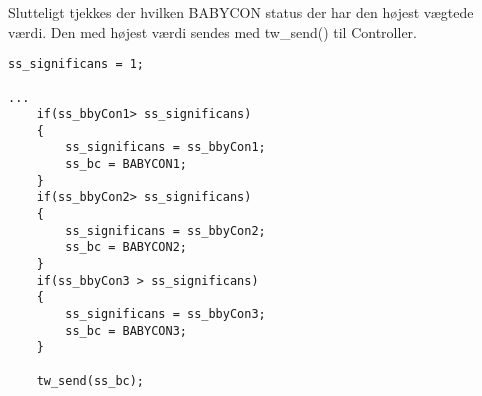 Slutteligt tjekkes der hvilken BABYCON status der har den højest vægtede værdi. Den med højest værdi sendes med tw\_send() til Controller. 
\begin{verbatim}
ss_significans = 1;

...
	if(ss_bbyCon1> ss_significans)
	{
		ss_significans = ss_bbyCon1;
		ss_bc = BABYCON1;
	}
	if(ss_bbyCon2> ss_significans)
	{
		ss_significans = ss_bbyCon2;
		ss_bc = BABYCON2;
	}
	if(ss_bbyCon3 > ss_significans)
	{
		ss_significans = ss_bbyCon3;
		ss_bc = BABYCON3;
	}

	tw_send(ss_bc);
\end{verbatim}
